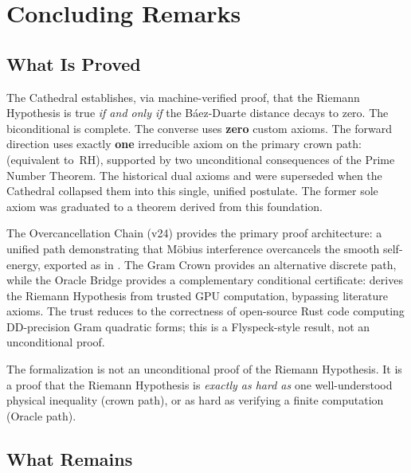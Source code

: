 \documentclass[11pt,a4paper]{article}
\begin{document}
\section{Concluding Remarks}
\label{sec:conclusion}

\subsection{What Is Proved}

The Cathedral establishes, via machine-verified proof, that the
Riemann Hypothesis is true \emph{if and only if} the B\'aez-Duarte
distance decays to zero. The biconditional is complete. The converse
uses \textbf{zero} custom axioms. The forward direction uses exactly
\textbf{one} irreducible axiom on the primary crown path:
 (equivalent to~RH), supported by
two unconditional consequences of the Prime Number Theorem. The
historical dual axioms  and
 were superseded when the Cathedral
collapsed them into this single, unified postulate. The former sole
axiom  was graduated to a theorem
derived from this foundation.

The Overcancellation Chain (v24) provides the primary proof
architecture: a unified path demonstrating that M\"obius interference
overcancels the smooth self-energy, exported as
 in
. The Gram Crown
provides an alternative discrete path, while the Oracle Bridge
provides a complementary conditional certificate:
 derives the Riemann Hypothesis from trusted
GPU computation, bypassing literature axioms. The trust reduces to
the correctness of open-source Rust code computing DD-precision Gram
quadratic forms; this is a Flyspeck-style result, not an
unconditional proof.

The formalization is not an unconditional proof of the Riemann Hypothesis.
It is a proof that the Riemann Hypothesis is \emph{exactly as hard as}
one well-understood physical inequality (crown path), or as hard as
verifying a finite computation (Oracle path).

\subsection{What Remains}
\end{document}
